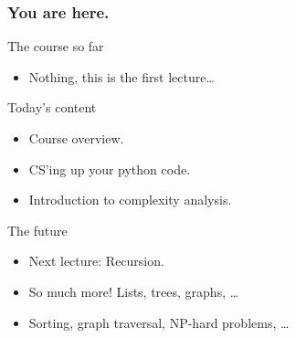 \begin{frame}
	\frametitle{You are here.}
	\begin{block}{The course so far}
		\begin{itemize}
			\item Nothing, this is the first lecture\dots
		\end{itemize}
	\end{block}
	\pause
	\begin{exampleblock}{Today's content}
		\begin{itemize}
			\item Course overview.
			\item CS'ing up your python code.
			\item Introduction to complexity analysis.
		\end{itemize}
	\end{exampleblock}
	\pause
	\begin{block}{The future}
		\begin{itemize}
			\item Next lecture: Recursion.
			\item So much more! Lists, trees, graphs, \dots
			\item Sorting, graph traversal, NP-hard problems, \dots
		\end{itemize}
	\end{block}
\end{frame}
